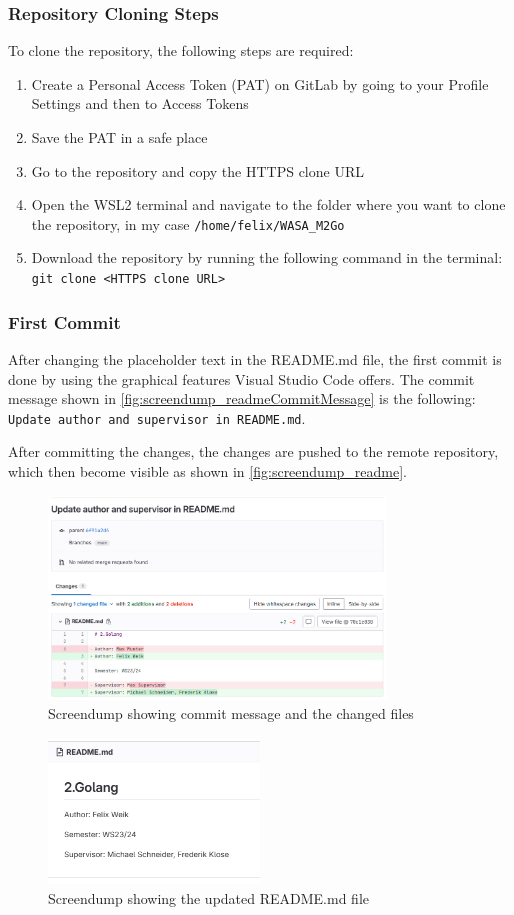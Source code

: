 \subsubsection*{Repository Cloning Steps}
To clone the repository, the following steps are required:
\begin{enumerate}
    \item Create a Personal Access Token (PAT) on GitLab by going to your Profile Settings and then to Access Tokens
    \item Save the PAT in a safe place
    \item Go to the repository and copy the HTTPS clone URL
    \item Open the WSL2 terminal and navigate to the folder where you want to clone the repository, in my case \texttt{/home/felix/WASA\_M2Go}
    \item Download the repository by running the following command in the terminal: \texttt{git clone <HTTPS clone URL>}
\end{enumerate}

\subsubsection*{First Commit}
After changing the placeholder text in the README.md file, the first commit is done by using the graphical features Visual Studio Code offers.
The commit message shown in \autoref{fig:screendump_readmeCommitMessage} is the following: \texttt{Update author and supervisor in README.md}.

After committing the changes, the changes are pushed to the remote repository, which then become visible as shown in \autoref{fig:screendump_readme}.

\begin{figure}[h]
    \centering
    \includegraphics[width=0.8\textwidth]{figures/goLang/golang_screendumpReadmeCommit.png}
    \caption{Screendump showing commit message and the changed files}
    \label{fig:screendump_readmeCommitMessage}
\end{figure}

\begin{figure}[h]
    \centering
    \includegraphics[width=0.5\textwidth]{figures/goLang/golang_screendumpReadme.png}
    \caption{Screendump showing the updated README.md file}
    \label{fig:screendump_readme}
\end{figure}
